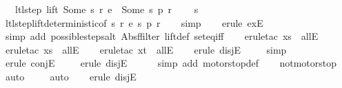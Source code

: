 \begin{isabellebody}
\ \ \ ltl{\isacharunderscore}step\ lift\ {\isacharparenleft}Some\ s{\isacharparenright}\ r\ e\ {\isacharequal}\ {\isacharparenleft}Some\ s{\isacharprime}{\isacharcomma}\ p{\isacharcomma}\ r{\isacharprime}{\isacharparenright}\ {\isasymLongrightarrow}\isanewline
\ \ \ s{\isacharprime}\ {\isasymin}\ {\isacharbraceleft}{}{\isacharcomma}\ {}{\isacharcomma}\ {}{\isacharcomma}\ {}{\isacharbraceright}{\isachardoublequoteclose}\isanewline
%
\isadelimproof
\ \ %
\endisadelimproof
%
\isatagproof
{}\isamarkupfalse%
\ ltl{\isacharunderscore}step{\isacharunderscore}lift{\isacharunderscore}deterministic{\isacharbrackleft}of\ s\ r\ e\ s{\isacharprime}\ p\ r{\isacharprime}{\isacharbrackright}\isanewline
\ \ \isamarkupfalse%
\ simp\isanewline
\ \ \isamarkupfalse%
\ {\isacharparenleft}erule\ exE{\isacharparenright}\isanewline
\ \ \isamarkupfalse%
\ {\isacharparenleft}simp\ add{\isacharcolon}\ possible{\isacharunderscore}steps{\isacharunderscore}alt{}\ Abs{\isacharunderscore}ffilter\ lift{\isacharunderscore}def\ set{\isacharunderscore}eq{\isacharunderscore}iff{\isacharparenright}\isanewline
\ \ \isamarkupfalse%
\ {\isacharparenleft}erule{\isacharunderscore}tac\ x{\isacharequal}s\ \ allE{\isacharparenright}\isanewline
\ \ \isamarkupfalse%
\ {\isacharparenleft}erule{\isacharunderscore}tac\ x{\isacharequal}s{\isacharprime}\ \ allE{\isacharparenright}\isanewline
\ \ \isamarkupfalse%
\ {\isacharparenleft}erule{\isacharunderscore}tac\ x{\isacharequal}t\ \ allE{\isacharparenright}\isanewline
\ \ \isamarkupfalse%
\ {\isacharparenleft}erule\ disjE{\isacharparenright}\isanewline
\ \ \ \isamarkupfalse%
\ simp\isanewline
\ \ \ \isamarkupfalse%
\ {\isacharparenleft}erule\ conjE{\isacharparenright}\isanewline
\ \ \ \isamarkupfalse%
\ {\isacharparenleft}erule\ disjE{\isacharparenright}\isanewline
\ \ \ \ \isamarkupfalse%
\ {\isacharparenleft}simp\ add{\isacharcolon}\ motorstop{}{\isacharunderscore}def{\isacharparenright}\isanewline
\ \ \isamarkupfalse%
\ not{\isacharunderscore}motorstop\ \isamarkupfalse%
\ auto{\isacharbrackleft}{}{\isacharbrackright}\isanewline
\ \ \ \isamarkupfalse%
\ auto{\isacharbrackleft}{}{\isacharbrackright}\isanewline
\ \ \isamarkupfalse%
\ {\isacharparenleft}erule\ disjE{\isacharparenright}\isanewline

\end{isabellebody}

